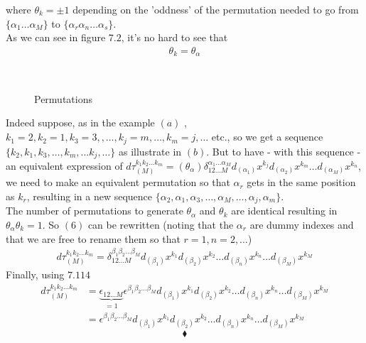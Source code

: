 where $\theta_{k}= \pm 1$ depending on the 'oddness' of the permutation needed to go from $\{\alpha_1\dots \alpha_M\}$ to $\{\alpha_r\alpha_n \dots \alpha_s\}$.\\
As we can see in figure $7.2$,  it's no hard to see that 
\begin{align}
\theta_{k}=\theta_{\alpha}
\end{align}
\begin{figure}[H]%
    \centering
    \subfloat[]{}\\
    \subfloat[]{}
\caption{Permutations}
\label{fig:fig_p255}
\end{figure}
Indeed suppose, as in the example $(a)$ ,  $k_1=2, k_2=1,k_3=3, ,\dots ,k_j = m,\dots , k_m=j,\dots$ etc., so we get a sequence $\{k_2, k_1,k_3,\dots, k_m,\dots k_j,\dots\}$ as illustrate in $(b)$. But to have - with this sequence - an equivalent expression of 
$d\tau_{(M)}^{k_1 k_2\dots k_m}=(\theta_{\alpha}) \delta_{1 2 \dots M}^{\alpha_1\dots \alpha_M}d_{(\alpha_1)}x^{k_j}d_{(\alpha_2)}x^{k_m}\dots d_{(\alpha_M)}x^{k_n}$, we need to make an equivalent permutation so that $\alpha_r$ gets in the same position  as $k_r$, resulting in a new sequence $\{\alpha_2,\alpha_1,\alpha_3,\dots,\alpha_M,\dots,\alpha_j, \alpha_m\}$.\\
The number of permutations to generate $\theta_{\alpha}$ and $\theta_k$ are identical resulting in $\theta_{\alpha}\theta_k=1$.
So $(6)$ can be rewritten (noting that the $\alpha_r$ are dummy indexes and that we are free to rename them so that $r=1, n=2,\dots$) 
\begin{align}
d\tau_{(M)}^{k_1 k_2\dots k_m}= \delta_{1 2 \dots M}^{\beta_1\beta_2 \dots \beta_M}d_{(\beta_1)}x^{k_1}d_{(\beta_2)}x^{k_2}\dots d_{(\beta_n)}x^{k_n}\dots d_{(\beta_M)}x^{k_M}
\end{align}
Finally, using $\mathbf{7.114}$ 
\begin{align}
d\tau_{(M)}^{k_1 k_2\dots k_m}&= \underbrace{\epsilon_{1 2 \dots M}}_{=1}\epsilon^{\beta_1\beta_2 \dots \beta_M}d_{(\beta_1)}x^{k_1}d_{(\beta_2)}x^{k_2}\dots d_{(\beta_n)}x^{k_n}\dots d_{(\beta_M)}x^{k_M}\\
&= \epsilon^{\beta_1\beta_2 \dots \beta_M}d_{(\beta_1)}x^{k_1}d_{(\beta_2)}x^{k_2}\dots d_{(\beta_n)}x^{k_n}\dots d_{(\beta_M)}x^{k_M}
\end{align}
$$\blacklozenge$$
\newpage


